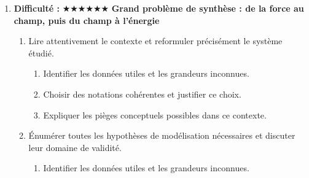 \documentclass[11pt,a4paper]{article}
\newcommand{\etoiles}[1]{\textbf{Difficulté : }#1}
\begin{document}
\begin{enumerate}[label=\textbf{Très long \arabic*.},leftmargin=*]
\begin{enumerate}[label=\textbf{\arabic*)}]
\begin{enumerate}[label=\alph*)]
\item Discuter la robustesse du résultat face à une variation de paramètre.
\item Proposer une ouverture vers une situation réelle plus complexe.
\end{enumerate}
\item Imaginer un protocole expérimental ou numérique permettant de confronter le modèle à des mesures.
\begin{enumerate}[label=\alph*)]
\item Comparer au moins deux scénarios différents.
\item Discuter la robustesse du résultat face à une variation de paramètre.
\item Proposer une ouverture vers une situation réelle plus complexe.
\end{enumerate}
\item Rédiger une conclusion scientifique : résultats, limites, prolongements vers la Terminale ou au-delà.
\begin{enumerate}[label=\alph*)]
\item Comparer au moins deux scénarios différents.
\item Discuter la robustesse du résultat face à une variation de paramètre.
\item Proposer une ouverture vers une situation réelle plus complexe.
\end{enumerate}
\end{enumerate}
\item \etoiles{★★★★★★}
\textbf{Grand problème de synthèse : de la force au champ, puis du champ à l'énergie}
\begin{enumerate}[label=\textbf{\arabic*)}]
\item Lire attentivement le contexte et reformuler précisément le système étudié.
\begin{enumerate}[label=\alph*)]
\item Identifier les données utiles et les grandeurs inconnues.
\item Choisir des notations cohérentes et justifier ce choix.
\item Expliquer les pièges conceptuels possibles dans ce contexte.
\end{enumerate}
\item Énumérer toutes les hypothèses de modélisation nécessaires et discuter leur domaine de validité.
\begin{enumerate}[label=\alph*)]
\item Identifier les données utiles et les grandeurs inconnues.

\end{enumerate}
\end{enumerate}
\end{enumerate}
\end{document}
